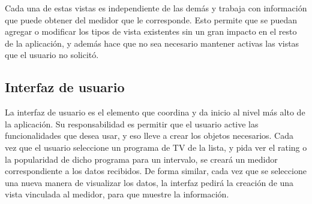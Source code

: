 Cada una de estas vistas es independiente de las demás y trabaja con información que puede obtener del medidor que le corresponde. Esto permite que se puedan agregar o modificar los tipos de vista existentes sin un gran impacto en el resto de la aplicación, y además hace que no sea necesario mantener activas las vistas que el usuario no solicitó.

\subsection{Interfaz de usuario}

La interfaz de usuario es el elemento que coordina y da inicio al nivel más alto de la aplicación. Su responsabilidad es permitir que el usuario active las funcionalidades que desea usar, y eso lleve a crear los objetos necesarios. Cada vez que el usuario seleccione un programa de TV de la lista, y pida ver el rating o la popularidad de dicho programa para un intervalo, se creará un medidor correspondiente a los datos recibidos. De forma similar, cada vez que se seleccione una nueva manera de visualizar los datos, la interfaz pedirá la creación de una vista vinculada al medidor, para que muestre la información.
